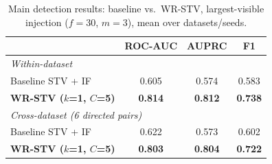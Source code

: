 \begin{table}[t]
\centering
\caption{Main detection results: baseline vs.\ WR-STV, largest-visible
injection ($f=30$, $m=3$), mean over datasets/seeds.}
\label{tab:main-results}
\begin{tabular}{lccc}
\toprule
& \textbf{ROC-AUC} & \textbf{AUPRC} & \textbf{F1} \\
\midrule
\multicolumn{4}{l}{\textit{Within-dataset}} \\
Baseline STV + IF & 0.605 & 0.574 & 0.583 \\
\textbf{WR-STV ($k$=1, $C$=5)} & \textbf{0.814} & \textbf{0.812} & \textbf{0.738} \\
\midrule
\multicolumn{4}{l}{\textit{Cross-dataset (6 directed pairs)}} \\
Baseline STV + IF & 0.622 & 0.573 & 0.602 \\
\textbf{WR-STV ($k$=1, $C$=5)} & \textbf{0.803} & \textbf{0.804} & \textbf{0.722} \\
\bottomrule
\end{tabular}
\end{table}
